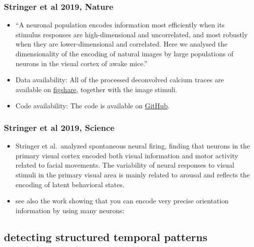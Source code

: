 \documentclass[brainsci, %
               review,submit,pdftex,moreauthors%
               ]{Definitions/mdpi}
\begin{document}
\subsubsection{Stringer et al 2019, Nature~\citep{stringer_high-dimensional_2019}}\label{stringer-et-al-2019-nature-stringer2019nature}
\begin{itemize}
 \item
  ``A neuronal population encodes information most efficiently when its stimulus responses are high-dimensional and uncorrelated, and most robustly when they are lower-dimensional and correlated. Here we analysed the dimensionality of the encoding of natural images by large populations of neurons in the visual cortex of awake mice.''
\item
  Data availability: All of the processed deconvolved calcium traces are available on \href{https://figshare.com/articles/Recordings_of_ten_thousand_neurons_in_visual_cortex_in_response_to_2_800_natural_images/6845348}{figshare}, together with the image stimuli.
\item
  Code availability: The code is available on \href{https://github.com/MouseLand/stringer-pachitariu-et-al-2018b}{GitHub}.
\end{itemize}

\subsubsection{Stringer et al 2019, Science~\citep{stringer_spontaneous_2019}}\label{stringer-et-al-2019-science-stringer2019science}
\begin{itemize}
\item
  Stringer et al.~analyzed spontaneous neural firing, finding that neurons in the primary visual cortex encoded both visual information and motor activity related to facial movements. The variability of neural responses to visual stimuli in the primary visual area is mainly related to arousal and reflects the encoding of latent behavioral states.
\item
  see also the work showing that you can encode very precise orientation information by using many neurons:~\citep{stringer_high-precision_2021}
\end{itemize}


\subsection{detecting structured temporal patterns}
\end{document}
